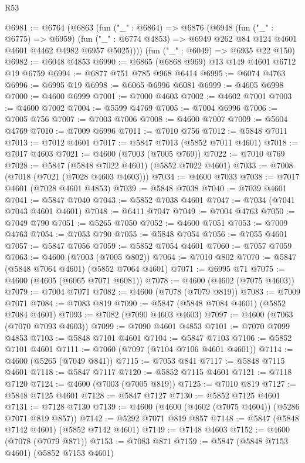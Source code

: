 \begin{lexlean}{R53}
\begin{coremodule}
@6981 := @6764
    (@6863
      (fun ("_" : @6864) =>
      @6876
        (@6948
          (fun ("_" : @6775) => @6959)
          (fun ("_" : @6774 @4853) => @6949 @262 @84 @124 @4601 @4601 @4462 @4982 @6957 @5025))))
    (fun ("_" : @6049) => @6935 @22 @150)
@6982 := @6048 @4853
@6990 := @6865 (@6868 @969) @13 @149 @4601 @6712 @19 @6759
@6994 := @6877 @751 @785 @968 @6414
@6995 := @6074 @4763
@6996 := @6995 @19
@6998 := @6065 @6996 @6081
@6999 := @4605 @6998
@7000 := @4600 @6999
@7001 := @7000 @4603
@7002 := @4602 @7001
@7003 := @4600 @7002
@7004 := @5599 @4769
@7005 := @7004 @6996
@7006 := @7005 @756
@7007 := @7003 @7006
@7008 := @4600 @7007
@7009 := @5604 @4769
@7010 := @7009 @6996
@7011 := @7010 @756
@7012 := @5848 @7011
@7013 := @7012 @4601
@7017 := @5847 @7013 (@5852 @7011 @4601)
@7018 := @7017 @4603
@7021 := @4600 (@7003 (@7005 @769))
@7022 := @7010 @769
@7028 := @5847 (@5848 @7022 @4601) (@5852 @7022 @4601)
@7033 := @7008 (@7018 (@7021 (@7028 @4603 @4603)))
@7034 := @4600 @7033
@7038 := @7017 @4601 (@7028 @4601 @4853)
@7039 := @5848 @7038
@7040 := @7039 @4601
@7041 := @5847 @7040
@7043 := @5852 @7038 @4601
@7047 := @7034 (@7041 @7043 @4601 @4601)
@7048 := @6411 @7047
@7049 := @7004 @4763
@7050 := @7049 @790
@7051 := @5265 @7050
@7052 := @4600 @7051
@7053 := @7009 @4763
@7054 := @7053 @790
@7055 := @5848 @7054
@7056 := @7055 @4601
@7057 := @5847 @7056
@7059 := @5852 @7054 @4601
@7060 := @7057 @7059
@7063 := @4600 (@7003 (@7005 @802))
@7064 := @7010 @802
@7070 := @5847 (@5848 @7064 @4601) (@5852 @7064 @4601)
@7071 := @6995 @71
@7075 := @4600 (@4605 (@6065 @7071 @6081))
@7078 := @4600 (@4602 (@7075 @4603))
@7079 := @7004 @7071
@7082 := @4600 (@7078 (@7079 @819))
@7083 := @7009 @7071
@7084 := @7083 @819
@7090 := @5847 (@5848 @7084 @4601) (@5852 @7084 @4601)
@7093 := @7082 (@7090 @4603 @4603)
@7097 := @4600 (@7063 (@7070 @7093 @4603))
@7099 := @7090 @4601 @4853
@7101 := @7070 @7099 @4853
@7103 := @5848 @7101 @4601
@7104 := @5847 @7103
@7106 := @5852 @7101 @4601
@7111 := @7060 (@7097 (@7104 @7106 @4601 @4601))
@7114 := @4600 (@5265 (@7049 @841))
@7115 := @7053 @841
@7117 := @5848 @7115 @4601
@7118 := @5847 @7117
@7120 := @5852 @7115 @4601
@7121 := @7118 @7120
@7124 := @4600 (@7003 (@7005 @819))
@7125 := @7010 @819
@7127 := @5848 @7125 @4601
@7128 := @5847 @7127
@7130 := @5852 @7125 @4601
@7131 := @7128 @7130
@7139 := @4600 (@4600 (@4602 (@7075 @4604)) (@5286 @7071 @819 @857))
@7142 := @5292 @7071 @819 @857
@7148 := @5847 (@5848 @7142 @4601) (@5852 @7142 @4601)
@7149 := @7148 @4603
@7152 := @4600 (@7078 (@7079 @871))
@7153 := @7083 @871
@7159 := @5847 (@5848 @7153 @4601) (@5852 @7153 @4601)

\end{coremodule}
\end{lexlean}
